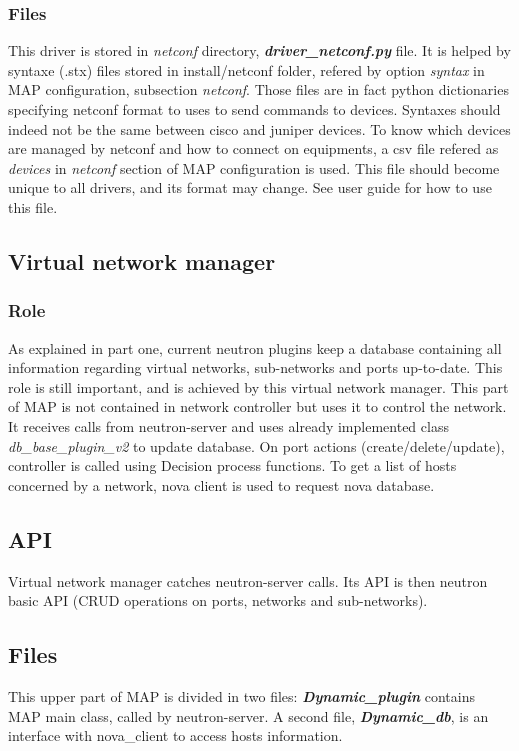 \subsubsection{Files}
This driver is stored in \emph{netconf} directory, \emph{\textbf{driver\_netconf.py}} file. It is helped by syntaxe (.stx) files stored in install/netconf folder, refered by option \emph{syntax} in MAP configuration, subsection \emph{netconf}. Those files are in fact python dictionaries specifying netconf format to uses to send commands to devices. Syntaxes should indeed not be the same between cisco and juniper devices. To know which devices are managed by netconf and how to connect on equipments, a csv file refered as \emph{devices} in \emph{netconf} section of MAP configuration is used. This file should become unique to all drivers, and its format may change. See user guide for how to use this file.

\subsection{Virtual network manager}
\subsubsection{Role}
As explained in part one, current neutron plugins keep a database containing all information regarding virtual networks, sub-networks and ports up-to-date. This role is still important, and is achieved by this virtual network manager. This part of MAP is not contained in network controller but uses it to control the network. It receives calls from neutron-server and uses already implemented class \emph{db\_base\_plugin\_v2} to update database. On port actions (create/delete/update), controller is called using Decision process functions. To get a list of hosts concerned by a network, nova client is used to request nova database.
\subsection{API}
Virtual network manager catches neutron-server calls. Its API is then neutron basic API (CRUD operations on ports, networks and sub-networks).
\subsection{Files}
This upper part of MAP is divided in two files: \emph{\textbf{Dynamic\_plugin}} contains MAP main class, called by neutron-server. A second file, \emph{\textbf{Dynamic\_db}}, is an interface with nova\_client to access hosts information.

